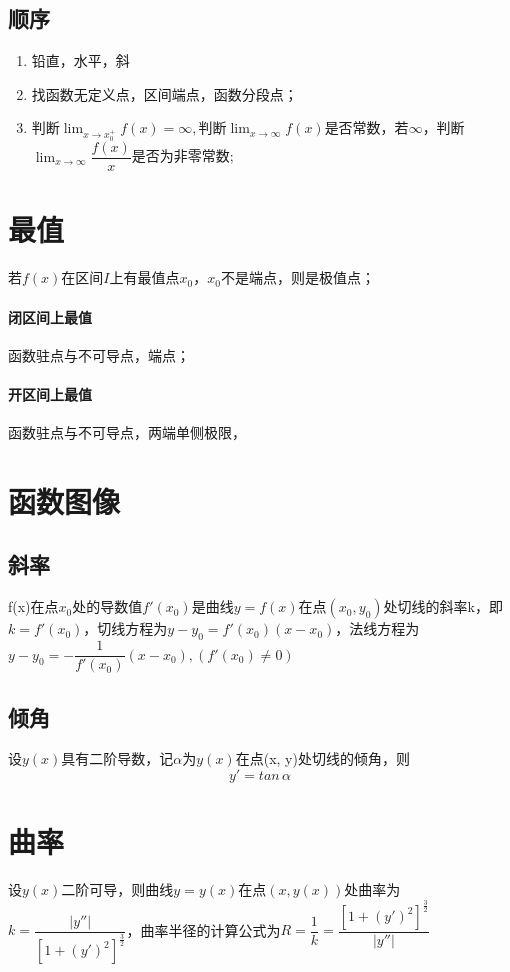 \subsection{顺序}
\begin{enumerate}
    \item 铅直，水平，斜
    \item 找函数无定义点，区间端点，函数分段点；
    \item 判断\(\displaystyle\lim_{x \to x_0^+}f(x) = \infty, \text{判断}\lim_{x \to \infty}f(x)\)是否常数，若\(\infty\)，判断\(\displaystyle\lim_{x \to \infty}\dfrac{f(x)}{x}\)是否为非零常数;
\end{enumerate}


\section{最值}
若\(f(x)\)在区间\(I\)上有最值点\(x_0\)，\(x_0\)不是端点，则是极值点；

\paragraph{闭区间上最值}
函数驻点与不可导点，端点；

\paragraph{开区间上最值}
函数驻点与不可导点，两端单侧极限，


\section{函数图像}

\subsection{斜率}
f(x)在点\(x_0\)处的导数值\(f'(x_0)\)是曲线\(y = f(x)\)在点\((x_0, y_0)\)处切线的斜率k，即\(k = f'(x_0)\)，切线方程为\(y - y_0 = f'(x_0)(x - x_0)\)，法线方程为\(y - y_0 = -\dfrac{1}{f'(x_0)}(x - x_0), (f'(x_0) \neq 0)\)

\subsection{倾角}
设\(y(x)\)具有二阶导数，记\(\alpha\)为\(y(x)\)在点(x, y)处切线的倾角，则\[y' = tan\,\alpha\]


\section{曲率}
设\(y(x)\)二阶可导，则曲线\(y = y(x)\)在点\((x, y(x))\)处曲率为\(k = \dfrac{|y''|}{[1 + (y')^2]^{\frac{3}{2}}}\)，曲率半径的计算公式为\(R = \dfrac{1}{k} = \dfrac{[1 + (y')^2]^{\frac{3}{2}}}{|y''|}\)


